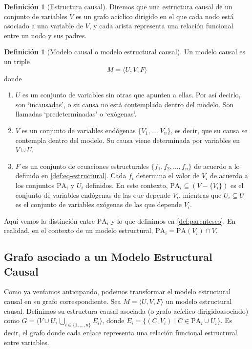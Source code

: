 \documentclass[a4paper,11pt,spanish, twoside]{tfg-uam-matematicas_25-26}
\theoremstyle{definition}
\newtheorem{defin}[teor]{Definición}
\begin{document}
\begin{defin}[Estructura causal]
Diremos que una estructura causal de un conjunto de variables $V$ es un grafo acíclico dirigido en el que cada nodo está asociado a una variable de $V$, y cada arista representa una relación funcional entre un nodo y sus padres.
\end{defin}

\begin{defin}[Modelo causal o modelo estructural causal]
Un modelo causal es un triple
\begin{equation*}
    M = \langle U, V, F\rangle
\end{equation*}
donde
\begin{enumerate}
    \item $U$ es un conjunto de variables sin otras que apunten a ellas. Por así decirlo, son `incausadas', o su causa no está contemplada dentro del modelo. Son llamadas `predeterminadas' o `exógenas'.
    \item $V$ es un conjunto de variables endógenas $\{V_1, \ldots, V_n\}$, es decir, que su causa se contempla dentro del modelo. Su causa viene determinada por variables en $V \cup U$.
    \item $F$ es un conjunto de ecuaciones estructurales $\{f_1, f_2, \ldots, f_n\}$ de acuerdo a lo definido en \ref{def:eq-estructural}. Cada $f_i$ determina el valor de $V_i$ de acuerdo a los conjuntos $\text{PA}_i$ y $U_i$ definidos. En este contexto, $\text{PA}_i \subseteq (V - \{V_i\}) $ es el conjunto de variables endógenas de las que depende $V_i$, mientras que $U_i \subseteq U$ es el conjunto de variables exógenas de las que depende $V_i$.
\end{enumerate}
\end{defin}
Aquí vemos la distinción entre $\text{PA}_i$ y lo que definimos en \ref{def:parentesco}. En realidad, en el contexto de un modelo estructural, $\text{PA}_i = \text{PA}(V_i) \cap V$.

\subsection{Grafo asociado a un Modelo Estructural Causal}
Como ya veníamos anticipando, podemos transformar el modelo estructural causal en su grafo correspondiente. Sea $M = \langle U, V, F\rangle$ un modelo estructural causal. Definimos su estructura causal asociada (o grafo acíclico dirigidoasociado) como $G = \langle V \cup U,\bigcup_{i\in \{1, \ldots,n \}} E_i \rangle$, donde $E_i = \{(C, V_i) \mid C \in \text{PA}_i \cup U_i\}$. Es decir, el grafo donde cada enlace representa una relación funcional estructural entre variables.
\end{document}
